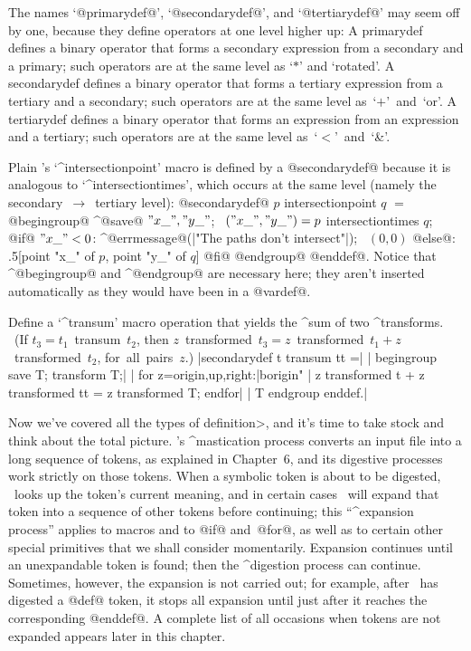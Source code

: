\ddanger The names `@primarydef@\kern1pt', `@secondarydef@\kern1pt',
and `@tertiarydef@\kern1pt' may
seem off by one, because they define operators at one level higher up:
A primarydef defines a binary operator that forms a secondary expression
from a secondary and a primary; such operators are at the same level
as `$\ast$' and `rotated'.
A secondarydef defines a binary operator that forms a tertiary expression
from a tertiary and a secondary; such operators are at the same level
as~`$+$'~and~`or'.
A tertiarydef defines a binary operator that forms an expression
from an expression and a tertiary; such operators are at the same level
as~`$<$'~and~`\&'.

\ddanger Plain \MF's `^{intersectionpoint}' macro is defined by a
@secondarydef@ because it is analogous to `^{intersectiontimes}', which
occurs at the same level (namely the secondary~$\rightarrow$~tertiary level):
\begindisplay
@secondarydef@ $p$ intersectionpoint $q$ $=$\cr
\quad @begingroup@ ^@save@ $"x\_","y\_"$; \
 $("x\_","y\_")=p$ intersectiontimes $q$;\cr
\quad @if@ $"x\_"<0$: ^@errmessage@(|"The paths don't intersect"|);
 \ $(0,0)$\cr
\quad @else@: .5[point "x\_" of $p$,
 point "y\_" of $q$] @fi@ @endgroup@ @enddef@.\cr
\enddisplay
Notice that ^@begingroup@ and ^@endgroup@ are necessary here; they aren't
inserted automatically as they would have been in a @vardef@.

\ddangerexercise Define a `^{transum}' macro operation that yields
the ^{sum} of two ^{transforms}. \ (If $t_3=t_1$~transum~$t_2$, then
$z$~transformed~$t_3=z$~transformed~$t_1+z$~transformed~$t_2$,
for~all~pairs~$z$.)
\answer |secondarydef t transum tt =|\parbreak
| begingroup save T; transform T;|\parbreak
| for z=origin,up,right:|^^"origin"\parbreak
|  z transformed t + z transformed tt = z transformed T; endfor|\parbreak
|  T endgroup enddef.|

\ddanger {}
Now we've covered all the types of \<definition>, and it's time to
take stock and think about the total picture. \MF's ^{mastication} process
converts an input file into a long sequence of tokens, as explained in
Chapter~6, and its digestive processes work strictly on those tokens.
When a symbolic token is about to be digested, \MF\ looks up the token's
current meaning, and in certain cases \MF\ will expand that token into
a sequence of other tokens before continuing; this ``^{expansion process}''
applies to macros and to @if@ and~@for@, as well as to certain other
special primitives that we shall consider momentarily. Expansion
continues until an unexpandable token is found; then the ^{digestion process}
can continue. Sometimes, however, the expansion is not carried out; for
example, after \MF\ has digested a @def@ token, it stops all expansion until
just after it reaches the corresponding @enddef@. A complete list of
all occasions when tokens are not expanded appears later in this chapter.

